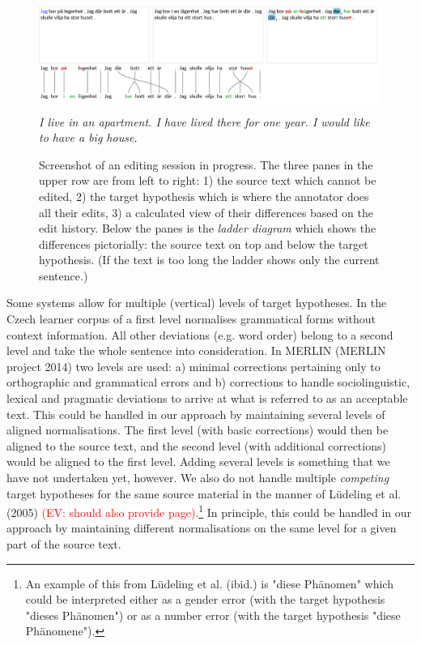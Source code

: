 \documentclass[10pt, a4paper]{article}
\begin{document}
\begin{figure}
\includegraphics[width=\textwidth, trim={0 1cm 0 0}, clip]{screenshot.pdf}
\emph{\small I live in an apartment. I have lived there for one year. I would like to have a big house.}
\caption{Screenshot of an editing session in progress. The three panes in the upper row are from left to right:
1) the source text which cannot be edited,
2) the target hypothesis which is where the annotator does all their edits,
3) a calculated view of their differences based on the edit history.
Below the panes is the \emph{ladder diagram} which shows the differences
pictorially: the source text on top and below the target hypothesis.
(If the text is too long the ladder shows only the current sentence.)
\label{fig:screenshot}
}
\end{figure}

Some systems allow for multiple (vertical) levels of target hypotheses. In the Czech learner corpus of  a
first level normalises grammatical forms without context information. All other deviations (e.g. word order) belong to a second level and take the whole sentence into consideration.
In MERLIN (MERLIN project 2014) two levels are used: a) minimal corrections pertaining only to orthographic and grammatical errors and b) corrections to handle sociolinguistic, lexical and pragmatic deviations to arrive at what is referred to as an acceptable text. This could be handled in our approach by maintaining several levels of aligned normalisations. The first level (with basic corrections) would then be aligned to the source text, and the second level (with additional corrections) would be aligned to the first level. Adding several levels is something that we have not undertaken yet, however. We also do not handle multiple {\em competing} target hypotheses for the same source material in the manner of L{\"u}deling et al. (2005) \textcolor{red}{(EV: should also provide page)}.\footnote{An example of this from L{\"u}deling et al. (ibid.) is "diese Ph{\"a}nomen" which could be interpreted either as a gender error (with the target hypothesis "dieses Ph{\"a}nomen") or as a number error (with the target hypothesis "diese Ph{\"a}nomene").} In principle, this could be handled in our approach by maintaining different normalisations on the same level for a given part of the source text.
\end{document}
